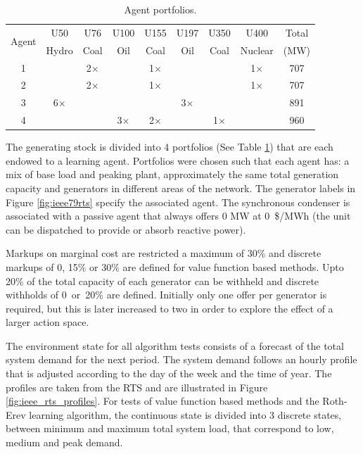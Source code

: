 \begin{table}
\centering
\begin{tabular}{c|c|c|c|c|c|c|c|c}
\hline
\multirow{2}{*}{Agent} &U50 &U76 &U100 &U155 &U197 &U350 &U400 &Total \\
 &Hydro &Coal &Oil &Coal &Oil &Coal &Nuclear &(MW) \\
\hline\hline
1 & &2$\times$ & &1$\times$ & & &1$\times$ &707 \\
2 & &2$\times$ & &1$\times$ & & &1$\times$ &707 \\
3 &6$\times$ & & & &3$\times$ & & &891 \\
4 & & &3$\times$ &2$\times$ & &1$\times$ & &960 \\
\hline
\end{tabular}
\caption{Agent portfolios.}
\label{tbl:agent_portfolios}
\end{table}

The generating stock is divided into 4 portfolios (See Table
\ref{tbl:agent_portfolios}) that are each endowed to a learning agent.
Portfolios were chosen such that each agent has: a mix of base load and peaking
plant, approximately the same total generation capacity and generators in
different areas of the network.  The generator labels in Figure
\ref{fig:ieee79rts} specify the associated agent.  The synchronous condenser is
associated with a passive agent that always offers 0 MW at 0~\$/MWh (the
unit can be dispatched to provide or absorb reactive power).


Markups on marginal cost are restricted a maximum of 30\% and discrete markups
of 0, 15\% or 30\% are defined for value function based methods.  Upto 20\% of
the total capacity of each generator can be withheld and discrete withholds of
0~or~20\% are defined.  Initially only one offer per generator is required, but
this is later increased to two in order to explore the effect of a larger
action space.

The environment state for all algorithm tests consists of a forecast of the
total system demand for the next period.  The system demand follows an hourly
profile that is adjusted according to the day of the week and the time of year.
The profiles are taken from the RTS and are illustrated in Figure
\ref{fig:ieee_rts_profiles}.  For tests of value function based methods and the
Roth-Erev learning algorithm, the continuous state is divided into 3 discrete
states, between minimum and maximum total system load, that correspond to low,
medium and peak demand.


